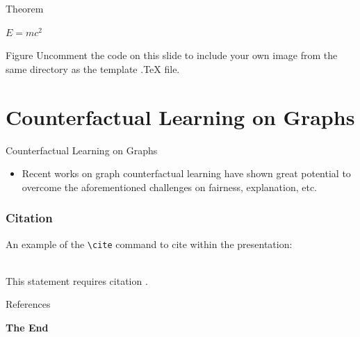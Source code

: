 \documentclass[aspectratio=169,xcolor=dvipsnames]{beamer}
\begin{document}
	
	\begin{frame}{Theorem}
		\begin{theorem}
			$E = mc^2$
		\end{theorem}
	\end{frame}
	
	
	\begin{frame}{Figure}
		Uncomment the code on this slide to include your own image from the same directory as the template .TeX file.
	\end{frame}
	
	
	
	\section{Counterfactual Learning on Graphs}
	\begin{frame}{Counterfactual Learning on Graphs}
		\begin{itemize}
			\item Recent works on graph counterfactual learning have shown great potential to overcome the aforementioned challenges 	on fairness, explanation, etc.
		\end{itemize}
	\end{frame}
	
	\begin{frame}[fragile] %
		\frametitle{Citation}
		An example of the \verb|\cite| command to cite within the presentation:\\~
		
		This statement requires citation \cite{p1}.
	\end{frame}
	
	
	\begin{frame}{References}
		\footnotesize
		
		
	\end{frame}
	
	
	
	\begin{frame}
		\Huge{\centerline{\textbf{The End}}}
	\end{frame}
	
	
\end{document}

